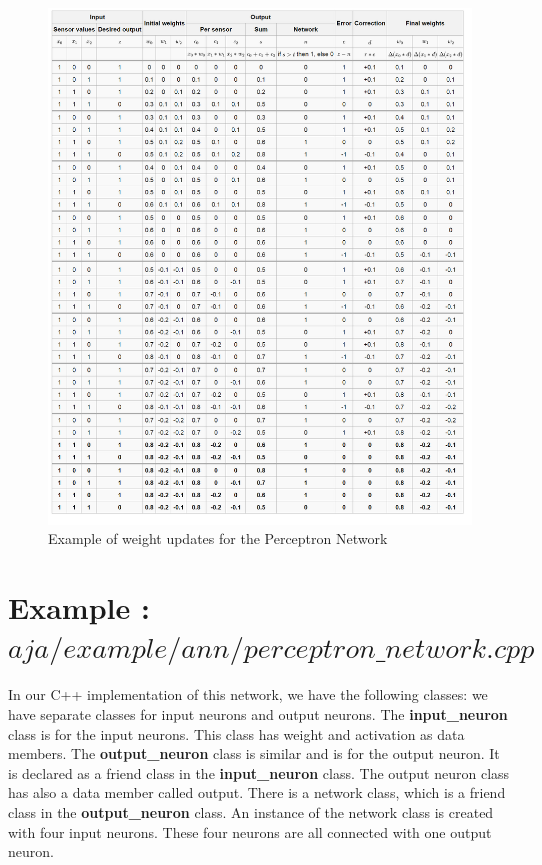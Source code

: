 \begin{figure}
\caption{Example of weight updates for the Perceptron Network}
\label{tab:example_of_weight_update_for_the_perceptron_network}
\centering
\includegraphics[scale=.5]{./img/example_weight_updates_perceptron_network.png}
\end{figure}

\section{Example : $aja/example/ann/perceptron\_network.cpp$}


In our C++ implementation of this network, we have the following classes: we have separate classes for input neurons and output neurons. The \textbf{input\_neuron} class is for the input neurons. This class has weight and activation as data members. The \textbf{output\_neuron} class is similar and is for the output neuron. It is declared as a friend class in the \textbf{input\_neuron} class. The output neuron class has also a data member called output. There is a network class, which is a friend class in the \textbf{output\_neuron} class. An instance of the network class is created with four input neurons. These four neurons are all connected with one output neuron.

